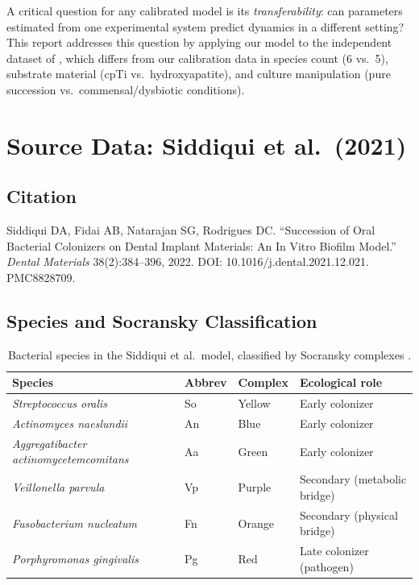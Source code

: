 \documentclass[11pt,a4paper]{article}
\begin{document}
A critical question for any calibrated model is its \textit{transferability}:
can parameters estimated from one experimental system predict dynamics in
a different setting? This report addresses this question by applying our
model to the independent dataset of \cite{siddiqui2021}, which differs
from our calibration data in species count (6 vs.\ 5), substrate material
(cpTi vs.\ hydroxyapatite), and culture manipulation (pure succession
vs.\ commensal/dysbiotic conditions).

\section{Source Data: Siddiqui et al.\ (2021)}

\subsection{Citation}

Siddiqui DA, Fidai AB, Natarajan SG, Rodrigues DC.
``Succession of Oral Bacterial Colonizers on Dental Implant Materials:
An In Vitro Biofilm Model.''
\textit{Dental Materials} 38(2):384--396, 2022.
DOI: 10.1016/j.dental.2021.12.021. PMC8828709.

\subsection{Species and Socransky Classification}

\begin{table}[H]\centering\small
\caption{Bacterial species in the Siddiqui et al.\ model, classified by
Socransky complexes \cite{socransky1998}.}
\label{tab:species}
\begin{tabular}{llll}
\toprule
Species & Abbrev & Complex & Ecological role \\
\midrule
\textit{Streptococcus oralis} & So & Yellow & Early colonizer \\
\textit{Actinomyces naeslundii} & An & Blue & Early colonizer \\
\textit{Aggregatibacter actinomycetemcomitans} & Aa & Green & Early colonizer \\
\textit{Veillonella parvula} & Vp & Purple & Secondary (metabolic bridge) \\
\textit{Fusobacterium nucleatum} & Fn & Orange & Secondary (physical bridge) \\
\textit{Porphyromonas gingivalis} & Pg & Red & Late colonizer (pathogen) \\
\bottomrule
\end{tabular}
\end{table}
\end{document}

